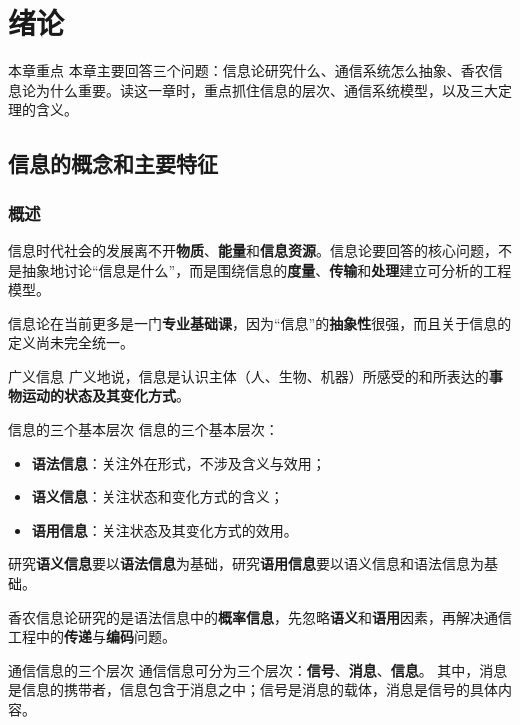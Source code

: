 \section{绪论}

\begin{remarkBox}{本章重点}
本章主要回答三个问题：信息论研究什么、通信系统怎么抽象、香农信息论为什么重要。读这一章时，重点抓住信息的层次、通信系统模型，以及三大定理的含义。
\end{remarkBox}

\subsection{信息的概念和主要特征}

\subsubsection{概述}
信息时代社会的发展离不开\textbf{物质}、\textbf{能量}和\textbf{信息资源}。信息论要回答的核心问题，不是抽象地讨论“信息是什么”，而是围绕信息的\textbf{度量}、\textbf{传输}和\textbf{处理}建立可分析的工程模型。

信息论在当前更多是一门\textbf{专业基础课}，因为“信息”的\textbf{抽象性}很强，而且关于信息的定义尚未完全统一。

\begin{definitionBox}{广义信息}
广义地说，信息是认识主体（人、生物、机器）所感受的和所表达的\textbf{事物运动的状态及其变化方式}。
\end{definitionBox}

\begin{definitionBox}{信息的三个基本层次}
信息的三个基本层次：
\begin{itemize}
  \item \textbf{语法信息}：关注外在形式，不涉及含义与效用；
  \item \textbf{语义信息}：关注状态和变化方式的含义；
  \item \textbf{语用信息}：关注状态及其变化方式的效用。
\end{itemize}
\end{definitionBox}

研究\textbf{语义信息}要以\textbf{语法信息}为基础，研究\textbf{语用信息}要以语义信息和语法信息为基础。

香农信息论研究的是语法信息中的\textbf{概率信息}，先忽略\textbf{语义}和\textbf{语用}因素，再解决通信工程中的\textbf{传递}与\textbf{编码}问题。

\begin{definitionBox}{通信信息的三个层次}
通信信息可分为三个层次：\textbf{信号}、\textbf{消息}、\textbf{信息}。
其中，消息是信息的携带者，信息包含于消息之中；信号是消息的载体，消息是信号的具体内容。
\end{definitionBox}

